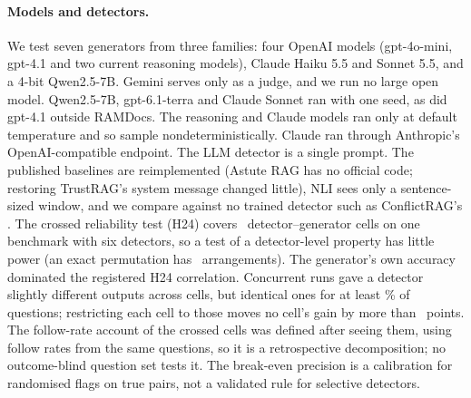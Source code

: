 \paragraph{Models and detectors.} We test seven generators from three families: four OpenAI models (gpt-4o-mini,
gpt-4.1 and two current reasoning models), Claude Haiku 5.5 and Sonnet 5.5, and a 4-bit Qwen2.5-7B. Gemini
serves only as a judge, and we run no large open model. Qwen2.5-7B, gpt-6.1-terra and Claude Sonnet ran with one seed,
as did gpt-4.1 outside RAMDocs. The reasoning and Claude models ran only at default temperature and so sample
nondeterministically. Claude ran through Anthropic's OpenAI-compatible endpoint. The LLM detector is a single
prompt. The published baselines are reimplemented (Astute RAG has no official code; restoring TrustRAG's system message
changed little), NLI sees only a sentence-sized window, and we compare against no trained detector such as
ConflictRAG's \citep{wang2026conflictrag}. The crossed reliability test (H24) covers \hTwentyFourCells\
detector--generator cells on one benchmark with six detectors, so a test of a detector-level property has little
power (an exact permutation has \hRedoNPerm\ arrangements). The generator's own accuracy dominated the
registered H24 correlation. Concurrent runs gave a detector slightly different outputs across cells, but identical
ones for at least \frozenShareMin\% of questions; restricting each cell to those moves no
cell's gain by more than \frozenMaxShift\ points. The follow-rate account of the crossed cells was defined after seeing
them, using follow rates from the same questions, so it is a retrospective decomposition; no outcome-blind
question set tests it. The break-even precision is a calibration for randomised flags on true pairs, not a validated
rule for selective detectors.

